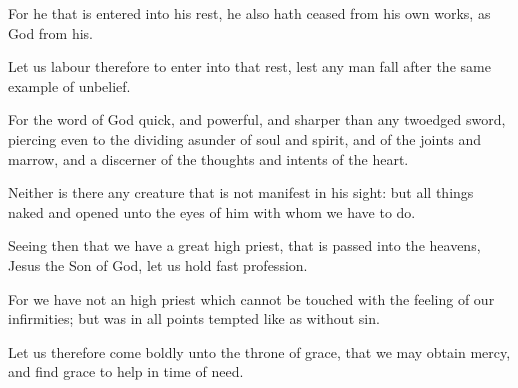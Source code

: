 {For he that is
entered
into
his
rest,
he
also hath
ceased
from his
own
works,
as
God
{}
from
his.

Let us
labour
therefore to
enter
into
that
rest,
lest any
man
fall
after the
same
example of
unbelief.

For the
word of
God
{}
quick,
and
powerful,
and
sharper
than
any
twoedged
sword,
piercing
even
to the dividing
asunder of
soul
and
spirit,
and of the
joints
and
marrow,
and
{} a
discerner of the
thoughts
and
intents of the
heart.

Neither is
there any
creature that is not
manifest
in
his
sight:
but all
things
{}
naked
and
opened unto the
eyes of
him
with
whom we
have to
do.

Seeing
then that we
have
a
great high
priest, that is passed
into the
heavens,
Jesus the
Son of
God, let us hold
fast
{}
profession.

For we
have
not an high priest
which
cannot be touched with the feeling
of
our
infirmities;
but
was
in all
points
tempted like
as
{}
without
sin.

Let
us
therefore
come
boldly unto the
throne of
grace,
that we may
obtain
mercy,
and
find
grace
to
help in time of
need.




\par }
